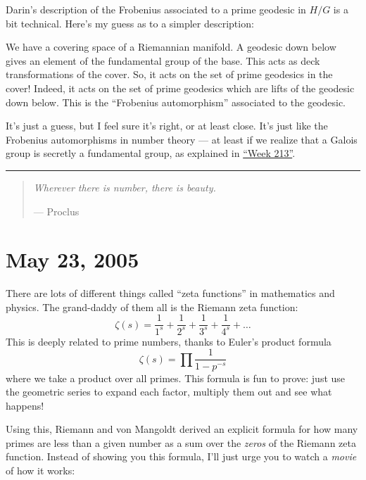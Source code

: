 \documentclass{article}
\def\tightlist{}
\renewcommand{\texttt}[1]{%
  \begingroup
  \ttfamily
  \begingroup\lccode`~=`/\lowercase{\endgroup\def~}{/\discretionary{}{}{}}%
  \begingroup\lccode`~=`[\lowercase{\endgroup\def~}{[\discretionary{}{}{}}%
  \begingroup\lccode`~=`.\lowercase{\endgroup\def~}{.\discretionary{}{}{}}%
  \catcode`/=\active\catcode`[=\active\catcode`.=\active
  \scantokens{#1\noexpand}%
  \endgroup
}
\begin{document}
Darin's description of the Frobenius associated to a prime geodesic in
\(H/G\) is a bit technical. Here's my guess as to a simpler description:

We have a covering space of a Riemannian manifold. A geodesic down below
gives an element of the fundamental group of the base. This acts as deck
transformations of the cover. So, it acts on the set of prime geodesics
in the cover! Indeed, it acts on the set of prime geodesics which are
lifts of the geodesic down below. This is the ``Frobenius automorphism''
associated to the geodesic.

It's just a guess, but I feel sure it's right, or at least close. It's
just like the Frobenius automorphisms in number theory --- at least if
we realize that a Galois group is secretly a fundamental group, as
explained in \protect\hyperlink{week213}{``Week 213''}.

\begin{center}\rule{0.5\linewidth}{0.5pt}\end{center}

\begin{quote}
\emph{Wherever there is number, there is beauty.}

--- Proclus
\end{quote}



\hypertarget{week216}{%
\section{May 23, 2005}\label{week216}}

There are lots of different things called ``zeta functions'' in
mathematics and physics. The grand-daddy of them all is the Riemann zeta
function:
\[\zeta(s) = \frac{1}{1^s} + \frac{1}{2^s} + \frac{1}{3^s} + \frac{1}{4^s} + \ldots\]
This is deeply related to prime numbers, thanks to Euler's product
formula \[\zeta(s) = \prod\frac{1}{1 - p^{-s}}\] where we take a product
over all primes. This formula is fun to prove: just use the geometric
series to expand each factor, multiply them out and see what happens!

Using this, Riemann and von Mangoldt derived an explicit formula for how
many primes are less than a given number as a sum over the \emph{zeros}
of the Riemann zeta function. Instead of showing you this formula, I'll
just urge you to watch a \emph{movie} of how it works:

\end{document}
